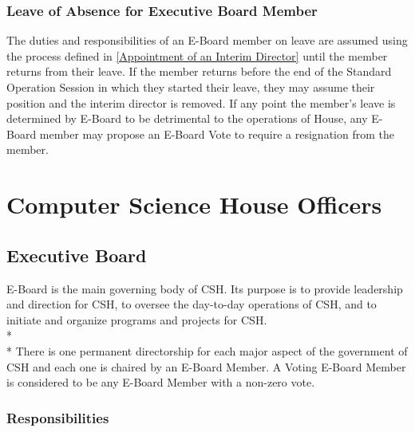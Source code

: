 \documentclass{article}
\newcommand{\article}[1]{\section{#1} \label{#1}}
\newcommand{\asection}[1]{\subsection{#1} \label{#1}}
\newcommand{\asubsection}[1]{\subsubsection{#1} \label{#1}}
\begin{document}
\asubsection{Leave of Absence for Executive Board Member}
The duties and responsibilities of an E-Board member on leave are assumed using the process defined in \ref{Appointment of an Interim Director} until the member returns from their leave.
If the member returns before the end of the Standard Operation Session in which they started their leave, they may assume their position and the interim director is removed. %
If any point the member's leave is determined by E-Board to be detrimental to the operations of House, any E-Board member may propose an E-Board Vote to require a resignation from the member.

\article{Computer Science House Officers}

\asection{Executive Board}
E-Board is the main governing body of CSH.
Its purpose is to provide leadership and direction for CSH, to oversee the day-to-day operations of CSH, and to initiate and organize programs and projects for CSH.
\\*\\*
There is one permanent directorship for each major aspect of the government of CSH and each one is chaired by an E-Board Member.
A Voting E-Board Member is considered to be any E-Board Member with a non-zero vote. %

\asubsection{Responsibilities}
\renewcommand{\theenumi}{\alph{enumi}} %
\end{document}
